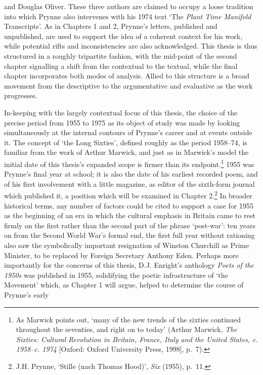 \documentclass[]{article}
\begin{document}
and Douglas Oliver. These three authors are claimed to occupy a loose
tradition into which Prynne also intervenes with his 1974 text `The
\emph{Plant Time Manifold} Transcripts'. As in Chapters 1 and 2,
Prynne's letters, published and unpublished, are used to support the
idea of a coherent context for his work, while potential rifts and
inconsistencies are also acknowledged. This thesis is thus structured in
a roughly tripartite fashion, with the mid-point of the second chapter
signalling a shift from the contextual to the textual, while the final
chapter incorporates both modes of analysis. Allied to this structure is
a broad movement from the descriptive to the argumentative and
evaluative as the work progresses.

In-keeping with the largely contextual focus of this thesis, the choice
of the precise period from 1955 to 1975 as its object of study was made
by looking simultaneously at the internal contours of Prynne's career
and at events outside it. The concept of `the Long Sixties', defined
roughly as the period 1958--74, is familiar from the work of Arthur
Marwick, and just as in Marwick's model the initial date of this
thesis's expanded scope is firmer than its endpoint.\footnote{As Marwick
  points out, `many of the new trends of the sixties continued
  throughout the seventies, and right on to today' (Arthur Marwick,
  \emph{The Sixties: Cultural Revolution in Britain, France, Italy and
  the United States, c. 1958--c. 1974} {[}Oxford: Oxford University
  Press, 1998{]}, p.~7).} 1955 was Prynne's final year at school; it is
also the date of his earliest recorded poem, and of his first
involvement with a little magazine, as editor of the sixth-form journal
which published it, a position which will be examined in Chapter
2.\footnote{J.H. Prynne, `Stille (nach Thomas Hood)', \emph{Six} (1955),
  p.~11.} In broader historical terms, any number of factors could be
cited to support a case for 1955 as the beginning of an era in which the
cultural emphasis in Britain came to rest firmly on the first rather
than the second part of the phrase `post-war': ten years on from the
Second World War's formal end, the first full year without rationing
also saw the symbolically important resignation of Winston Churchill as
Prime Minister, to be replaced by Foreign Secretary Anthony Eden.
Perhaps more importantly for the concerns of this thesis, D.J. Enright's
anthology \emph{Poets of the 1950s} was published in 1955, solidifying
the poetic infrastructure of `the Movement' which, as Chapter 1 will
argue, helped to determine the course of Prynne's early
\end{document}
